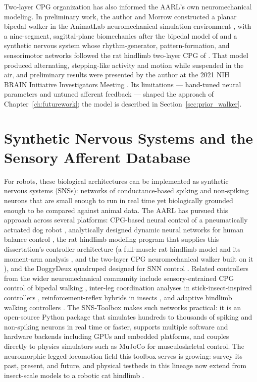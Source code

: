 Two-layer CPG organization has also informed the AARL's own neuromechanical modeling. In preliminary work, the author and Morrow constructed a planar bipedal walker in the AnimatLab neuromechanical simulation environment \citep{cofer_animatlab_2010}, with a nine-segment, sagittal-plane biomechanics after the bipedal model of \citet{li_bipedal_2017} and a synthetic nervous system whose rhythm-generator, pattern-formation, and sensorimotor networks followed the rat hindlimb two-layer CPG of \citet{deng_neuromechanical_2019}. That model produced alternating, stepping-like activity and motion while suspended in the air, and preliminary results were presented by the author at the 2021 NIH BRAIN Initiative Investigators Meeting \citep{bolenTorqueValuesArtificialKnee2021June15-17}. Its limitations --- hand-tuned neural parameters and untuned afferent feedback --- shaped the approach of Chapter~\ref{ch:futurework}; the model is described in Section~\ref{sec:prior_walker}.

\section{Synthetic Nervous Systems and the Sensory Afferent Database}\label{sec:bg_sns}

For robots, these biological architectures can be implemented as synthetic nervous systems (SNSs): networks of conductance-based spiking and non-spiking neurons that are small enough to run in real time yet biologically grounded enough to be compared against animal data. The AARL has pursued this approach across several platforms: CPG-based neural control of a pneumatically actuated dog robot \citep{hunt_development_2017}, analytically designed dynamic neural networks for human balance control \citep{hilts_dynamic_2019}, the rat hindlimb modeling program that supplies this dissertation's controller architecture (a full-muscle rat hindlimb model and its moment-arm analysis \citep{young_analyzing_2019}, and the two-layer CPG neuromechanical walker built on it \citep{deng_neuromechanical_2019}), and the DoggyDeux quadruped designed for SNN control \citep{scharzenberger_design_2019}. Related controllers from the wider neuromechanical community include sensory-entrained CPG control of bipedal walking \citep{li_bipedal_2017}, inter-leg coordination analyses in stick-insect-inspired controllers \citep{nourse_analyzing_2019}, reinforcement-reflex hybrids in insects \citep{goldsmith_investigating_2021}, and adaptive hindlimb walking controllers \citep{schilling_adaptive_2022}. The SNS-Toolbox \citep{nourse_sns_2023} makes such networks practical: it is an open-source Python package that simulates hundreds to thousands of spiking and non-spiking neurons in real time or faster, supports multiple software and hardware backends including GPUs and embedded platforms, and couples directly to physics simulators such as MuJoCo for musculoskeletal control. The neuromorphic legged-locomotion field this toolbox serves is growing: \citet{szczecinski_perspective_2023} survey its past, present, and future, and physical testbeds in this lineage now extend from insect-scale models to a robotic cat hindlimb \citep{armstead_design_2025}.

